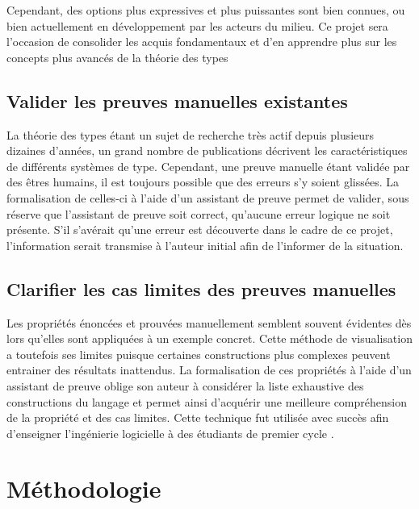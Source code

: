 \documentclass[a4paper, oneside, 12pt, titlepage]{article}
\begin{document}
Cependant, des options plus expressives et plus puissantes sont bien connues, ou bien
actuellement en développement par les acteurs du milieu. Ce projet sera l'occasion de consolider
les acquis fondamentaux et d'en apprendre plus sur les concepts plus avancés de la théorie des types

\subsection{Valider les preuves manuelles existantes}

La théorie des types étant un sujet de recherche très actif depuis plusieurs dizaines d'années, un
grand nombre de publications décrivent les caractéristiques de différents systèmes de type.
Cependant, une preuve manuelle étant validée par des êtres humains, il est toujours possible que des
erreurs s'y soient glissées. La formalisation de celles-ci à l'aide d'un assistant de preuve permet
de valider, sous réserve que l'assistant de preuve soit correct, qu'aucune erreur logique ne soit
présente. S'il s'avérait qu'une erreur est découverte dans le cadre de ce projet, l'information
serait transmise à l'auteur initial afin de l'informer de la situation.

\subsection{Clarifier les cas limites des preuves manuelles}

Les propriétés énoncées et prouvées manuellement semblent souvent évidentes dès lors qu'elles sont
appliquées à un exemple concret. Cette méthode de visualisation a toutefois ses limites puisque
certaines constructions plus complexes peuvent entrainer des résultats inattendus. La formalisation
de ces propriétés à l'aide d'un assistant de preuve oblige son auteur à considérer la liste
exhaustive des constructions du langage et permet ainsi d'acquérir une meilleure compréhension de la
propriété et des cas limites. Cette technique fut utilisée avec succès afin d'enseigner l'ingénierie
logicielle à des étudiants de premier cycle \cite{page:thm-proving-undergraduates, pierce:LambdaTA,
nipkow:teaching-proof-assistant}.

\section{Méthodologie}

%
\end{document}
